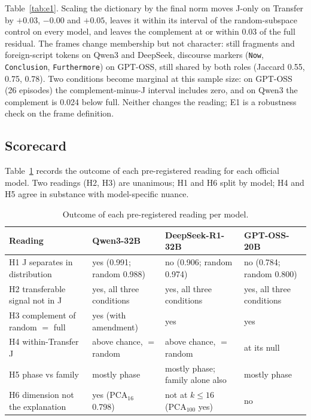 \documentclass[11pt,a4paper]{article}
\begin{document}
Table~\ref{tab:e1}. Scaling the dictionary by the final norm moves J-only on Transfer by $+0.03$, $-0.00$ and $+0.05$, leaves it within its interval of the random-subspace control on every model, and leaves the complement at or within 0.03 of the full residual. The frames change membership but not character: still fragments and foreign-script tokens on Qwen3 and DeepSeek, discourse markers (\texttt{Now}, \texttt{Conclusion}, \texttt{Furthermore}) on GPT-OSS, still shared by both roles (Jaccard 0.55, 0.75, 0.78). Two conditions become marginal at this sample size: on GPT-OSS (26 episodes) the complement-minus-J interval includes zero, and on Qwen3 the complement is 0.024 below full. Neither changes the reading; E1 is a robustness check on the frame definition.

\subsection{Scorecard}

Table~\ref{tab:score} records the outcome of each pre-registered reading for each official model. Two readings (H2, H3) are unanimous; H1 and H6 split by model; H4 and H5 agree in substance with model-specific nuance.

\begin{table}[t]
\centering
\caption{Outcome of each pre-registered reading per model.}
\label{tab:score}
\small
\begin{tabularx}{\textwidth}{@{}l>{\raggedright\arraybackslash}X>{\raggedright\arraybackslash}X>{\raggedright\arraybackslash}X@{}}
\toprule
\textbf{Reading} & \textbf{Qwen3-32B} & \textbf{DeepSeek-R1-32B} & \textbf{GPT-OSS-20B} \\
\midrule
H1 J separates in distribution & yes (0.991; random 0.988) & no (0.906; random 0.974) & no (0.784; random 0.800) \\
H2 transferable signal not in J & yes, all three conditions & yes, all three conditions & yes, all three conditions \\
H3 complement of random $=$ full & yes (with amendment) & yes & yes \\
H4 within-Transfer J & above chance, $=$ random & above chance, $=$ random & at its null \\
H5 phase vs family & mostly phase & mostly phase; family alone also & mostly phase \\
H6 dimension not the explanation & yes (PCA$_{16}$ 0.798) & not at $k\le16$ (PCA$_{100}$ yes) & no \\
\bottomrule
\end{tabularx}
\end{table}
\end{document}
